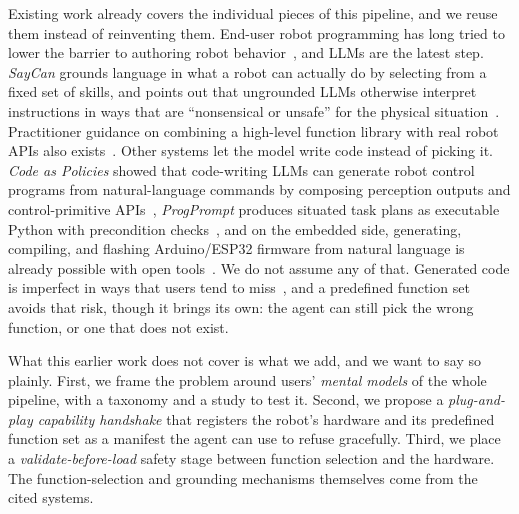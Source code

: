 \documentclass[sigconf]{acmart}
\begin{document}
Existing work already covers the individual pieces of this pipeline, and we reuse them instead of reinventing them. End-user robot programming has long tried to lower the barrier to authoring robot behavior~\cite{ajaykumar2021survey}, and LLMs are the latest step. \emph{SayCan} grounds language in what a robot can actually do by selecting from a fixed set of skills, and points out that ungrounded LLMs otherwise interpret instructions in ways that are ``nonsensical or unsafe'' for the physical situation~\cite{ahn2022saycan}. Practitioner guidance on combining a high-level function library with real robot APIs also exists~\cite{vemprala2024chatgpt}. Other systems let the model write code instead of picking it. \emph{Code as Policies} showed that code-writing LLMs can generate robot control programs from natural-language commands by composing perception outputs and control-primitive APIs~\cite{liang2023code}, \emph{ProgPrompt} produces situated task plans as executable Python with precondition checks~\cite{singh2023progprompt}, and on the embedded side, generating, compiling, and flashing Arduino/ESP32 firmware from natural language is already possible with open tools~\cite{rajendra2024arduinollm}. We do not assume any of that. Generated code is imperfect in ways that users tend to miss~\cite{chen2021evaluating, perry2023users, vaithilingam2022expectation}, and a predefined function set avoids that risk, though it brings its own: the agent can still pick the wrong function, or one that does not exist.

What this earlier work does not cover is what we add, and we want to say so plainly. First, we frame the problem around users' \emph{mental models} of the whole pipeline, with a taxonomy and a study to test it. Second, we propose a \emph{plug-and-play capability handshake} that registers the robot's hardware and its predefined function set as a manifest the agent can use to refuse gracefully. Third, we place a \emph{validate-before-load} safety stage between function selection and the hardware. The function-selection and grounding mechanisms themselves come from the cited systems.
\end{document}
